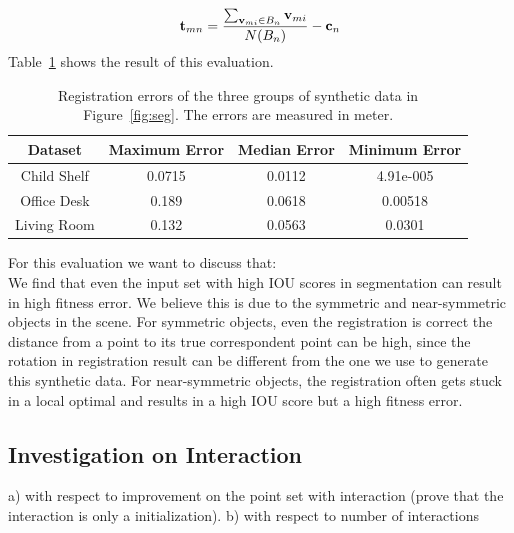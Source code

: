 \begin{equation}
\label{equ:error}
\mathbf{t}_{mn}=\frac{\sum_{\mathbf{v}_{mi} \in B_n}\mathbf{v}_{mi}}{N(B_n)}-\mathbf{c}_n
\end{equation}
Table~\ref{tab:regerror} shows the result of this evaluation.
\begin{table}
	\centering
	\caption{Registration errors of the three groups of synthetic data in Figure~\ref{fig:seg}. The errors are measured in meter. }
	\begin{tabular}{c c c c}
		Dataset & Maximum Error & Median Error & Minimum Error \\
		\hline
		Child Shelf & 0.0715 & 0.0112 & 4.91e-005 \\   
		Office Desk & 0.189  & 0.0618 & 0.00518 \\
		Living Room & 0.132  & 0.0563 & 0.0301\\
	\end{tabular}
	\label{tab:regerror}
\end{table}
For this evaluation we want to discuss that:\\
We find that even the input set with high IOU scores in segmentation can result in high fitness error. We believe this is due to the symmetric and near-symmetric objects in the scene. For symmetric objects, even the registration is correct the distance from a point to its true correspondent point can be high, since the rotation in registration result can be different from the one we use to generate this synthetic data. For near-symmetric objects, the registration often gets stuck in a local optimal and results in a high IOU score but a high fitness error.
\subsection{Investigation on Interaction}
a) with respect to improvement on the point set with interaction (prove that the interaction is only a initialization).
b) with respect to number of interactions 
